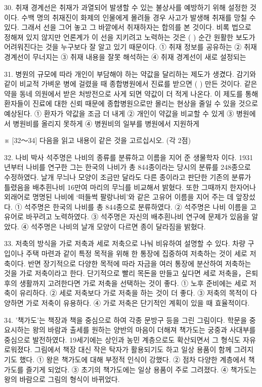 \documentclass[12pt]{article}
\begin{document}
\begin{enumerate}[1.]
30.
  취재 경계선은 취재가 과열되어 발생할 수 있는 불상사를 예방하기
위해 설정한 것이다. 수백 명의 취재진이 화제의 인물에게 몰려들 경우
사고가 발생해 취재를 망칠 수 있다. 그래서 선을 그어 놓고 그 바깥에서
취재하자는 합의를 본 것이다. 비록 법으로 정해져 있지 않지만 언론계가
이 선을 지키려고 노력하는 것은 (      ) 순간 원활한 보도가
어려워진다는 것을 누구보다 잘 알고 있기 때문이다.
① 취재 정보를 공유하는
② 취재 경계선이 무너지는
③ 취재 내용을 잘못 해석하는
④ 취재 경계선이 새로 설정되는


31.
  병원의 규모에 따라 개인이 부담해야 하는 약값을 달리하는 제도가
생겼다. 감기와 같이 비교적 가벼운 병에 걸렸을 때 종합병원에서 진료를
받으면 (      ) 만든 것이다. 같은 약을 동네 의원에서 받은
처방전으로 사게 되면 약값이 더 적게 나온다. 이 제도를 통해 환자들이
진료에 대한 신뢰 때문에 종합병원으로만 몰리는 현상을 줄일 수 있을
것으로 예상된다.
① 환자가 약값을 조금 더 내게
② 개인이 약값을 비교할 수 있게
③ 병원에서 병원비를 올리지 못하게
④ 병원비의 일부를 병원에서 지원하게




※ [32～34] 다음을 읽고 내용이 같은 것을 고르십시오. (각 2점)

32.
  나비 박사 석주명은 나비의 종류를 분류하고 이름을 지어 준 생물학자
이다. 1931년부터 나비를 연구한 그는 한국의 나비가 총 844종이라는 당시의
분류를 248종으로 수정하였다. 날개 무늬나 모양이 조금만 달라도 다른
종이라고 판단한 기존의 분류가 틀렸음을 배추흰나비 16만여 마리의 무늬를
비교해서 밝혔다. 또한 그때까지 한자어나 외래어로 명명된 나비에 ‘떠들썩
팔랑나비’와 같은 고유어 이름을 지어 주는 데 앞장섰다.
① 석주명은 한국의 나비를 총 844종으로 분류하였다.
② 석주명은 나비 이름을 고유어로 바꾸려고 노력하였다.
③ 석주명은 자신의 배추흰나비 연구에 문제가 있음을 알았다.
④ 석주명은 나비의 날개 모양이 다르면 종이 달라짐을 밝혔다.


33.
  저축의 방식을 가로 저축과 세로 저축으로 나눠 비유하여 설명할 수
있다. 차량 구입이나 주택 마련과 같이 특정 목적을 위해 한 통장에 집중하여
저축하는 것이 세로 저축이다. 반면 장기적으로 다양한 목적에 따라 자금을
여러 통장에 분산하여 저축하는 것을 가로 저축이라고 한다. 단기적으로
빨리 목돈을 만들고 싶다면 세로 저축을，은퇴 후의 생활까지 고려한다면
가로 저축을 선택하는 것이 좋다.
① 노후 준비에는 세로 저축이 유리하다.
② 세로 저축보다 가로 저축을 하는 것이 더 좋다.
③ 저축의 목적이 다양하면 가로 저축이 유용하다.
④ 가로 저축은 단기적인 계획이 있을 때 효율적이다.


34.
  '책가도’는 책장과 책을 중심으로 하여 각종 문방구 등을 그린 그림이다.
학문을 중요시하는 왕의 바람과 출세를 원하는 양반의 마음이 더해져
책가도는 궁중과 사대부를 중심으로 발전하였다. 19세기에는 상인과 농민
계층으로도 확산되면서 그 형식도 자유로워졌다. 그림에서 책장 대신 작은
탁자가 활용되기도 하고 일상 용품이 함께 그려지기도 했다.
① 왕은 책가도에 대해 부정적 인식이 강했다.
② 점차 다양한 계층에서 책가도를 즐기게 되었다.
③ 초기의 책가도에는 일상 용품이 주로 그려졌다.
④ 책가도는 왕의 바람으로 그림의 형식이 바뀌었다.





\end{enumerate}
\end{document}
